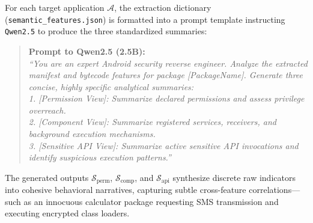 \documentclass[12pt,a4paper,oneside]{report}
\begin{document}
For each target application $\mathcal{A}$, the extraction dictionary (\texttt{semantic\_features.json}) is formatted into a prompt template instructing \texttt{Qwen2.5} to produce the three standardized summaries:
\begin{quote}
\small
\textbf{Prompt to Qwen2.5 (2.5B):} \\
\textit{``You are an expert Android security reverse engineer. Analyze the extracted manifest and bytecode features for package [PackageName]. Generate three concise, highly specific analytical summaries: \\
1. [Permission View]: Summarize declared permissions and assess privilege overreach. \\
2. [Component View]: Summarize registered services, receivers, and background execution mechanisms. \\
3. [Sensitive API View]: Summarize active sensitive API invocations and identify suspicious execution patterns.''}
\end{quote}

The generated outputs $\mathcal{S}_{\text{perm}}$, $\mathcal{S}_{\text{comp}}$, and $\mathcal{S}_{\text{api}}$ synthesize discrete raw indicators into cohesive behavioral narratives, capturing subtle cross-feature correlations—such as an innocuous calculator package requesting SMS transmission and executing encrypted class loaders.
\end{document}
